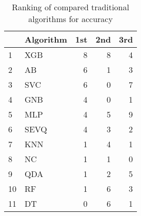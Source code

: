 \begin{table}[H]
\footnotesize
\centering
\caption{Ranking of compared traditional algorithms for accuracy}
\label{tab:Traditional places accuracy}
\begin{tabular}{llrrr}
\hline
{} & Algorithm &  1st &  2nd &  3rd \\
\hline
1  &       XGB &    8 &    8 &    4 \\
2  &        AB &    6 &    1 &    3 \\
3  &       SVC &    6 &    0 &    7 \\
4  &       GNB &    4 &    0 &    1 \\
5  &       MLP &    4 &    5 &    9 \\
6  &      SEVQ &    4 &    3 &    2 \\
7  &       KNN &    1 &    4 &    1 \\
8  &        NC &    1 &    1 &    0 \\
9  &       QDA &    1 &    2 &    5 \\
10 &        RF &    1 &    6 &    3 \\
11 &        DT &    0 &    6 &    1 \\
\hline
\end{tabular}
\end{table}
